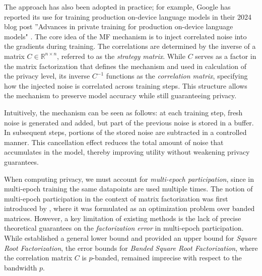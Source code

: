 \documentclass{article} %
\begin{document}
The approach has also been adopted in practice; for example, Google has reported its use for training production on-device language models in their 2024 blog post ''Advances in private training for production on-device language models" \citep{xu2024advances}. The core idea of the MF mechanism is to inject correlated noise into the gradients during training. The correlations are determined by the inverse of a matrix $C \in \mathbb{R}^{n \times n}$, referred to as the \emph{strategy matrix}. While $C$ serves as a factor in the matrix factorization that defines the mechanism and used in calculation of the privacy level, its inverse $C^{-1}$ functions as the \emph{correlation matrix}, specifying how the injected noise is correlated across training steps. This structure allows the mechanism to preserve model accuracy while still guaranteeing privacy.

{Intuitively, the mechanism can be seen as follows: at each training step, fresh noise is generated and added, but part of the previous noise is stored in a buffer. In subsequent steps, portions of the stored noise are subtracted in a controlled manner. This cancellation effect reduces the total amount of noise that accumulates in the model, thereby improving utility without weakening privacy guarantees.}


{When computing privacy, we must account for \emph{multi-epoch participation}, since in multi-epoch training the same datapoints are used multiple times. The notion of multi-epoch participation in the context of matrix factorization was first introduced by \citet{choquette2023amplified}, where it was formulated as an optimization problem over banded matrices.} 
However, a key limitation of existing methods is the lack of precise theoretical guarantees on the \textit{factorization error} in multi-epoch participation. While \citet{kalinin2024} established a general lower bound and provided an upper bound for \textit{Square Root Factorization}, the error bounds for \textit{Banded Square Root Factorization}, where the correlation matrix $C$ is $p$-banded, remained imprecise with respect to the bandwidth $p$. 
\end{document}
